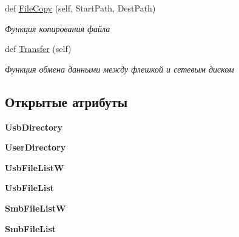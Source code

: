 \begin{DoxyCompactItemize}
def \mbox{\hyperlink{classisofc-service_1_1SambaConnect_a8dba7ba6f3526fcab4703dba0f5bdcd5}{File\+Copy}} (self, Start\+Path, Dest\+Path)
\begin{DoxyCompactList}\small\item\em Функция копирования файла \end{DoxyCompactList}\item 
def \mbox{\hyperlink{classisofc-service_1_1SambaConnect_aeaa767a173ce5e1f7d92770d53b7878d}{Transfer}} (self)
\begin{DoxyCompactList}\small\item\em Функция обмена данными между флешкой и сетевым диском \end{DoxyCompactList}\end{DoxyCompactItemize}
\subsection*{Открытые атрибуты}
\begin{DoxyCompactItemize}
\item 
\mbox{\label{classisofc-service_1_1SambaConnect_a767da85da916ca28133a064ffec5226a}} 
{\bfseries Usb\+Directory}
\item 
\mbox{\label{classisofc-service_1_1SambaConnect_a9dbdd0637919c53f4e418a60947bf0a8}} 
{\bfseries User\+Directory}
\item 
\mbox{\label{classisofc-service_1_1SambaConnect_ace6db57e15b3072564e64158acdae12d}} 
{\bfseries Usb\+File\+ListW}
\item 
\mbox{\label{classisofc-service_1_1SambaConnect_a63c3cf060d4a486fc6b519e672d5b06e}} 
{\bfseries Usb\+File\+List}
\item 
\mbox{\label{classisofc-service_1_1SambaConnect_af494c5da04a261fa643e045bc1574c62}} 
{\bfseries Smb\+File\+ListW}
\item 
\mbox{\label{classisofc-service_1_1SambaConnect_a1f623e59b471b27d3f9146cfcb3b83c0}} 
{\bfseries Smb\+File\+List}
\end{DoxyCompactItemize}


